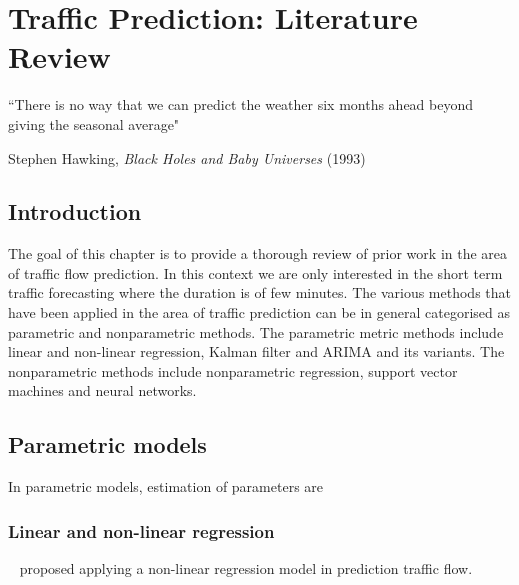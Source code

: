 
\chapter{Traffic Prediction: Literature Review}

\label{Chapter2}


{``There is no way that we can predict the weather six months ahead beyond giving the seasonal
average"}
\begin{flushright}
Stephen Hawking, \textit{Black Holes and Baby Universes} (1993)
\end{flushright}

\section{Introduction}
The goal of this chapter is to provide a thorough review of prior work in the area of traffic flow
prediction. In this context we are only interested in the short term traffic forecasting where the
duration is of few minutes. The various methods that have been applied in the area of traffic
prediction can be in general categorised as parametric and nonparametric methods. The parametric
metric methods include linear and non-linear regression, Kalman filter and ARIMA and its
variants. The nonparametric methods include nonparametric regression, support vector machines and neural networks.

\section{Parametric models}
In parametric models, estimation of parameters are

\subsection{Linear and non-linear regression}
~\citet{hogberg1976estimation} proposed applying a non-linear regression model in prediction traffic flow.


